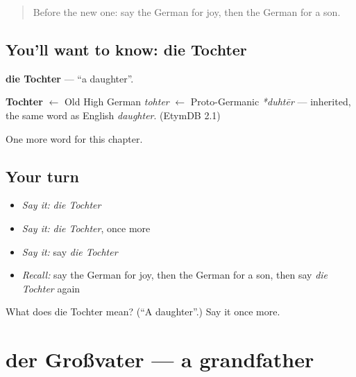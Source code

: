 \label{lesson:GE-C61-tochter}



\begin{quote}
Before the new one: say the German for joy, then the German for a son.
\end{quote}

\subsection*{You'll want to know: die Tochter}
\textbf{die Tochter} — \textquotedblleft{}a daughter\textquotedblright{}.

\begin{cousinweb}
\textbf{Tochter} $\leftarrow$ Old High German \emph{tohter} $\leftarrow$ Proto-Germanic \emph{*duhtēr} — inherited, the same word as English \emph{daughter}. (EtymDB 2.1)
\end{cousinweb}

\begin{grammarlens}[title={What you've built}]
One more word for this chapter.
\end{grammarlens}

\subsection*{Your turn}
\begin{itemize}
\raggedright
  \item \emph{Say it:} \emph{die Tochter}
  \item \emph{Say it:} \emph{die Tochter}, once more
  \item \emph{Say it:} say \emph{die Tochter}
  \item \emph{Recall:} say the German for joy, then the German for a son, then say \emph{die Tochter} again
\end{itemize}

\begin{tcolorbox}[breakable,colback=teal!4,colframe=teal!35!black,title={Before you move on}]
What does die Tochter mean? (\textquotedblleft{}A daughter\textquotedblright{}.) Say it once more.
\end{tcolorbox}
\section[der Großvater]{der Großvater — a grandfather}

\label{lesson:GE-C61-grossvater}




